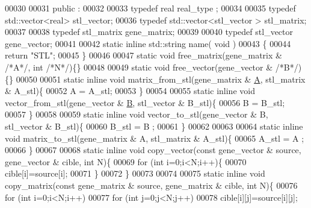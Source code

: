 \begin{DoxyCode}
00030 
00031 public :
00032 
00033   \textcolor{keyword}{typedef} real real\_type ;
00034 
00035   \textcolor{keyword}{typedef} std::vector<real>  stl\_vector;
00036   \textcolor{keyword}{typedef} std::vector<stl\_vector > stl\_matrix;
00037 
00038   \textcolor{keyword}{typedef} stl\_matrix gene\_matrix;
00039 
00040   \textcolor{keyword}{typedef} stl\_vector gene\_vector;
00041 
00042   \textcolor{keyword}{static} \textcolor{keyword}{inline} std::string name( \textcolor{keywordtype}{void} )
00043   \{
00044     \textcolor{keywordflow}{return} \textcolor{stringliteral}{"STL"};
00045   \}
00046 
00047   \textcolor{keyword}{static} \textcolor{keywordtype}{void} free\_matrix(gene\_matrix & \textcolor{comment}{/*A*/}, \textcolor{keywordtype}{int} \textcolor{comment}{/*N*/})\{\}
00048 
00049   \textcolor{keyword}{static} \textcolor{keywordtype}{void} free\_vector(gene\_vector & \textcolor{comment}{/*B*/})\{\}
00050 
00051   \textcolor{keyword}{static} \textcolor{keyword}{inline} \textcolor{keywordtype}{void} matrix\_from\_stl(gene\_matrix & \hyperlink{group___core___module_class_eigen_1_1_matrix}{A}, stl\_matrix & A\_stl)\{
00052     A = A\_stl;
00053   \}
00054 
00055   \textcolor{keyword}{static} \textcolor{keyword}{inline} \textcolor{keywordtype}{void} vector\_from\_stl(gene\_vector & \hyperlink{group___core___module_class_eigen_1_1_matrix}{B}, stl\_vector & B\_stl)\{
00056     B = B\_stl;
00057   \}
00058 
00059   \textcolor{keyword}{static} \textcolor{keyword}{inline} \textcolor{keywordtype}{void} vector\_to\_stl(gene\_vector & B, stl\_vector & B\_stl)\{
00060     B\_stl = B ;
00061   \}
00062 
00063 
00064   \textcolor{keyword}{static} \textcolor{keyword}{inline} \textcolor{keywordtype}{void} matrix\_to\_stl(gene\_matrix & A, stl\_matrix & A\_stl)\{
00065     A\_stl = A ;
00066   \}
00067 
00068   \textcolor{keyword}{static} \textcolor{keyword}{inline} \textcolor{keywordtype}{void} copy\_vector(\textcolor{keyword}{const} gene\_vector & source, gene\_vector & cible, \textcolor{keywordtype}{int} N)\{
00069     \textcolor{keywordflow}{for} (\textcolor{keywordtype}{int} i=0;i<N;i++)\{
00070       cible[i]=source[i];
00071     \}
00072   \}
00073 
00074 
00075   \textcolor{keyword}{static} \textcolor{keyword}{inline} \textcolor{keywordtype}{void} copy\_matrix(\textcolor{keyword}{const} gene\_matrix & source, gene\_matrix & cible, \textcolor{keywordtype}{int} N)\{
00076     \textcolor{keywordflow}{for} (\textcolor{keywordtype}{int} i=0;i<N;i++)
00077       \textcolor{keywordflow}{for} (\textcolor{keywordtype}{int} j=0;j<N;j++)
00078         cible[i][j]=source[i][j];

\end{DoxyCode}
